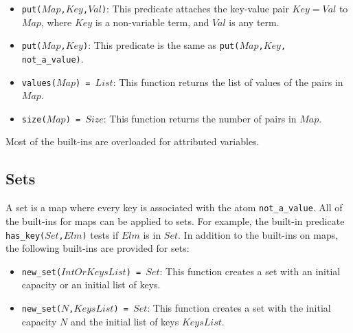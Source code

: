 \begin{itemize}
\item \texttt{put($Map$,$Key$,$Val$)}: This predicate attaches the key-value pair \texttt{$Key$$=$$Val$} to \texttt{$Map$}, where \texttt{$Key$} is a non-variable term, and \texttt{$Val$} is any term. 
\item \texttt{put($Map$,$Key$)}: This predicate is the same as \texttt{put($Map$,$Key$, not\_a\_value)}.
\item \texttt{values($Map$) = $List$}: This function returns the list of values of the pairs in $Map$.
\item \texttt{size($Map$) = $Size$}: This function returns the number of pairs in $Map$.
\end{itemize}
Most of the built-ins are overloaded for attributed variables.

\subsection{Sets}
A set is a map where every key is associated with the atom \texttt{not\_a\_value}. All of the built-ins for maps can be applied to sets. For example, the built-in predicate \texttt{has\_key($Set$,$Elm$)} tests if $Elm$ is in $Set$. In addition to the built-ins on maps, the following built-ins are provided for sets:
\begin{itemize}
\item \texttt{new\_set($IntOrKeysList$) = $Set$}: This function creates a set with an initial capacity or an initial list of keys.
\item \texttt{new\_set($N$,$KeysList$) = $Set$}: This function creates a set with the initial capacity $N$ and the initial list of keys $KeysList$.
\end{itemize}

